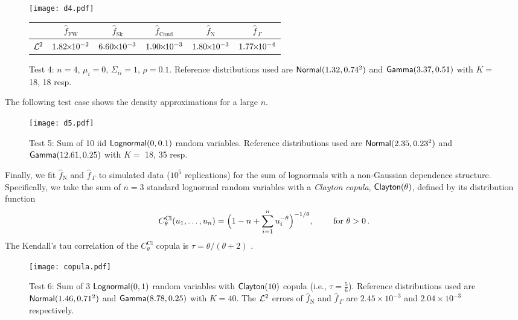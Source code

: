 \begin{figure}[H]
\centering
\texttt{[image: d4.pdf]}

\vspace{4mm}

\begin{tabular}{c|c|c|c|c|c|}
\cline{2-6}
                         & $\widehat{f}_{\mathrm{FW}}$  & $\widehat{f}_{\mathrm{Sk}}$ & $\widehat{f}_{\mathrm{Cond}}$ & $\widehat{f}_{\mathrm{N}}$  & $\widehat{f}_{\,\Gamma}$ \\ \hline
\multicolumn{1}{|c|}{$\mathcal{L}^2$} & $1.82 {\mkern-2mu\times\mkern-2mu} 10^{-2}$ & $6.60 {\mkern-2mu\times\mkern-2mu} 10^{-3}$ & $1.90 {\mkern-2mu\times\mkern-2mu} 10^{-3}$ & $1.80 {\mkern-2mu\times\mkern-2mu} 10^{-3}$ & $1.77 {\mkern-2mu\times\mkern-2mu} 10^{-4}$ \\ \hline
\end{tabular}
\caption*{Test 4: $n=4$, $\mu_i = 0$, $\Sigma_{ii}=1$, $\rho = 0.1$. Reference distributions used are $\mathsf{Normal}(1.32,0.74^2)$ and $\mathsf{Gamma}(3.37,0.51)$ with $K =$ 18, 18 resp.}
\end{figure}

The following test case shows the density approximations for a large $n$.

\begin{figure}[H]
\centering
\texttt{[image: d5.pdf]}
\caption*{Test 5: Sum of 10 iid $\mathsf{Lognormal}(0,0.1)$ random variables. Reference distributions used are $\mathsf{Normal}(2.35,0.23^2)$ and $\mathsf{Gamma}(12.61,0.25)$ with $K =$ 18, 35 resp.}
\end{figure}


Finally, we fit $\widehat{f}_{\mathrm{N}}$ and $\widehat{f}_{\,\Gamma}$ to simulated data ($10^5$ replications) for the sum of lognormals with a non-Gaussian dependence structure. Specifically, we take the sum of $n = 3$ standard lognormal random variables with a \emph{Clayton copula}, $\mathsf{Clayton}(\theta)$, defined by its distribution function
\[
C^{\text{Cl}}_\theta(u_1, \dots, u_n) = \Bigl( 1 - n + \sum_{i=1}^n u_i^{-\theta} \Bigr)^{-1/\theta}, \qquad \text{ for } \theta > 0 \,.
\]
The Kendall's tau correlation of the $C^{\text{Cl}}_\theta$ copula is $\tau = \theta / (\theta + 2)$ \cite{mcneil2015quantitative}.

\begin{figure}
\centering
\texttt{[image: copula.pdf]}
\caption*{Test 6: Sum of 3 $\mathsf{Lognormal}(0,1)$ random variables with $\mathsf{Clayton}(10)$ copula (i.e., $\tau = \frac56$). Reference distributions used are $\mathsf{Normal}(1.46,0.71^2)$ and $\mathsf{Gamma}(8.78,0.25)$ with $K = 40$. The $\mathcal{L}^2$ errors of $\widehat{f}_{\mathrm{N}}$ and $\widehat{f}_{\,\Gamma}$ are $2.45 \times 10^{-3}$ and $2.04 \times 10^{-3}$ respectively.}
\end{figure}


